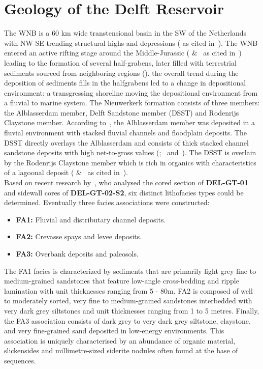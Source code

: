 \section{Geology of the Delft Reservoir}
The WNB is a 60 km wide transtensional basin in the SW of the Netherlands with NW-SE trending structural highs and depressions (\cite{ziegler1990geological} as cited in~\cite{donselaar2015reservoir}). The WNB entered an active rifting stage around the Middle-Jurassic (\cite{bodenhausen1981habitat} \&~\cite{den1996fluviomarine} as cited in~\cite{willems2020geology}) leading to the formation of several half-grabens, later filled with terrestrial sediments sourced from neighboring regions (\cite{den1996fluviomarine}). the overall trend during the deposition of sediments fills in the halfgrabens led to a change in depositional environment: a transgressing shoreline moving the depositional environment from a fluvial to marine system. The Nieuwerkerk formation consists of three members: the Alblasserdam member, Delft Sandstone member (DSST) and Rodenrijs Claystone member. According to~\cite{devault2002tectonostratigraphy}, the Alblasserdam member was deposited in a fluvial environment with stacked fluvial channels and floodplain deposits. The DSST directly overlays the Alblasserdam and consists of thick stacked channel sandstone deposits with high net-to-gross values (\cite{willems2020geology};~\cite{mijnlieff2020introduction} and~\cite{bruining2023sedimentological}). The DSST is overlain by the Rodenrijs Claystone member which is rich in organics with characteristics of a lagoonal deposit (\cite{willems2020geology} \&~\cite{devault2002tectonostratigraphy} as cited in~\cite{bruining2023sedimentological}).\\
Based on recent research by~\cite{bruining2023sedimentological}, who analysed the cored section of \textbf{DEL-GT-01} and sidewall cores of \textbf{DEL-GT-02-S2}, six distinct lithofacies types could be determined. Eventually three facies associations were constructed:
\begin{itemize}
    \item \textbf{FA1:} Fluvial and distributary channel deposits.
    \item \textbf{FA2:} Crevasse spays and levee deposits.
    \item \textbf{FA3:} Overbank deposits and paleosols.
\end{itemize}
The FA1 facies is characterized by sediments that are primarily light grey fine to medium-grained sandstones that feature low-angle cross-bedding and ripple lamination with unit thicknesses ranging from 5 - 80m. FA2  is composed of well to moderately sorted, very fine to medium-grained sandstones interbedded with very dark grey siltstones and unit thicknesses ranging from 1 to 5 metres. Finally, the FA3 association consists of dark grey to very dark grey siltstone, claystone, and very fine-grained sand deposited in low-energy environments. This association  is uniquely characterised by an abundance of organic material, slickensides and millimetre-sized siderite nodules often found at the base of sequences.\\
